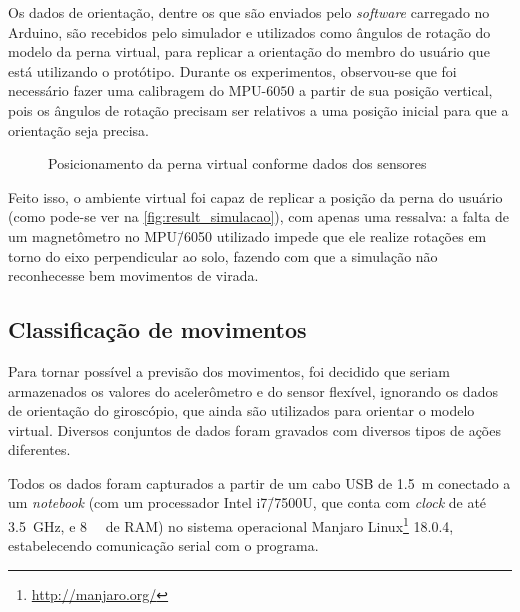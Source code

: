 Os dados de orientação, dentre os que são enviados pelo \textit{software} carregado no Arduino, são recebidos pelo simulador e utilizados como ângulos de rotação do modelo da perna virtual, para replicar a orientação do membro do usuário que está utilizando o protótipo. Durante os experimentos, observou-se que foi necessário fazer uma calibragem do MPU-\(6050\) a partir de sua posição vertical, pois os ângulos de rotação precisam ser relativos a uma posição inicial para que a orientação seja precisa.

\begin{figure}[ht]
	\caption{\label{fig:result_simulacao}Posicionamento da perna virtual conforme dados dos sensores}
	\begin{center}
	\end{center}
\end{figure}

Feito isso, o ambiente virtual foi capaz de replicar a posição da perna do usuário (como pode-se ver na \autoref{fig:result_simulacao}), com apenas uma ressalva: a falta de um magnetômetro no MPU\=/6050 utilizado impede que ele realize rotações em torno do eixo perpendicular ao solo, fazendo com que a simulação não reconhecesse bem movimentos de virada.

\subsection{Classificação de movimentos}\label{sec:result_classif}

Para tornar possível a previsão dos movimentos, foi decidido que seriam armazenados os valores do acelerômetro e do sensor flexível, ignorando os dados de orientação do giroscópio, que ainda são utilizados para orientar o modelo virtual. Diversos conjuntos de dados foram gravados com diversos tipos de ações diferentes.

Todos os dados foram capturados a partir de um cabo USB de \SI{1.5}{\meter} conectado a um \textit{notebook} (com um processador Intel i7\=/7500U, que conta com \textit{clock} de até \SI{3.5}{\giga\hertz}, e \SI{8}{\giga\byte} de RAM) no sistema operacional Manjaro Linux\footnote{\url{http://manjaro.org/}} 18.0.4, estabelecendo comunicação serial com o programa.

